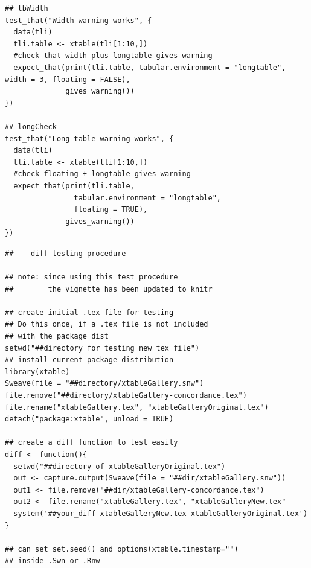 \documentclass{memoir}\usepackage[]{graphicx}\usepackage[]{color}
\begin{document}
\begin{lstlisting}
## tbWidth
test_that("Width warning works", {
  data(tli)
  tli.table <- xtable(tli[1:10,])
  #check that width plus longtable gives warning
  expect_that(print(tli.table, tabular.environment = "longtable", width = 3, floating = FALSE),
              gives_warning())
})

## longCheck
test_that("Long table warning works", {
  data(tli)
  tli.table <- xtable(tli[1:10,])
  #check floating + longtable gives warning
  expect_that(print(tli.table, 
                tabular.environment = "longtable", 
                floating = TRUE),
              gives_warning())
})
\end{lstlisting}

\newpage

\begin{lstlisting}
## -- diff testing procedure --

## note: since using this test procedure 
##        the vignette has been updated to knitr

## create initial .tex file for testing
## Do this once, if a .tex file is not included
## with the package dist
setwd("##directory for testing new tex file")
## install current package distribution
library(xtable)
Sweave(file = "##directory/xtableGallery.snw")
file.remove("##directory/xtableGallery-concordance.tex")
file.rename("xtableGallery.tex", "xtableGalleryOriginal.tex")
detach("package:xtable", unload = TRUE)

## create a diff function to test easily
diff <- function(){
  setwd("##directory of xtableGalleryOriginal.tex")
  out <- capture.output(Sweave(file = "##dir/xtableGallery.snw"))
  out1 <- file.remove("##dir/xtableGallery-concordance.tex")
  out2 <- file.rename("xtableGallery.tex", "xtableGalleryNew.tex"
  system('##your_diff xtableGalleryNew.tex xtableGalleryOriginal.tex')
}

## can set set.seed() and options(xtable.timestamp="") 
## inside .Swn or .Rnw
\end{lstlisting}
\end{document}
